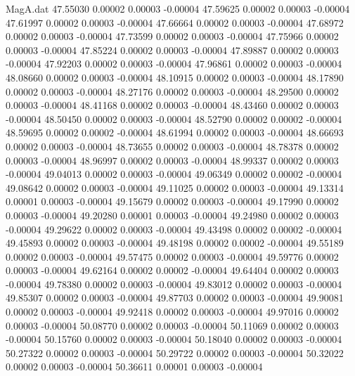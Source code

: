 \begin{filecontents}{MagA.dat}
  47.55030    0.00002    0.00003   -0.00004
  47.59625    0.00002    0.00003   -0.00004
  47.61997    0.00002    0.00003   -0.00004
  47.66664    0.00002    0.00003   -0.00004
  47.68972    0.00002    0.00003   -0.00004
  47.73599    0.00002    0.00003   -0.00004
  47.75966    0.00002    0.00003   -0.00004
  47.85224    0.00002    0.00003   -0.00004
  47.89887    0.00002    0.00003   -0.00004
  47.92203    0.00002    0.00003   -0.00004
  47.96861    0.00002    0.00003   -0.00004
  48.08660    0.00002    0.00003   -0.00004
  48.10915    0.00002    0.00003   -0.00004
  48.17890    0.00002    0.00003   -0.00004
  48.27176    0.00002    0.00003   -0.00004
  48.29500    0.00002    0.00003   -0.00004
  48.41168    0.00002    0.00003   -0.00004
  48.43460    0.00002    0.00003   -0.00004
  48.50450    0.00002    0.00003   -0.00004
  48.52790    0.00002    0.00002   -0.00004
  48.59695    0.00002    0.00002   -0.00004
  48.61994    0.00002    0.00003   -0.00004
  48.66693    0.00002    0.00003   -0.00004
  48.73655    0.00002    0.00003   -0.00004
  48.78378    0.00002    0.00003   -0.00004
  48.96997    0.00002    0.00003   -0.00004
  48.99337    0.00002    0.00003   -0.00004
  49.04013    0.00002    0.00003   -0.00004
  49.06349    0.00002    0.00002   -0.00004
  49.08642    0.00002    0.00003   -0.00004
  49.11025    0.00002    0.00003   -0.00004
  49.13314    0.00001    0.00003   -0.00004
  49.15679    0.00002    0.00003   -0.00004
  49.17990    0.00002    0.00003   -0.00004
  49.20280    0.00001    0.00003   -0.00004
  49.24980    0.00002    0.00003   -0.00004
  49.29622    0.00002    0.00003   -0.00004
  49.43498    0.00002    0.00002   -0.00004
  49.45893    0.00002    0.00003   -0.00004
  49.48198    0.00002    0.00002   -0.00004
  49.55189    0.00002    0.00003   -0.00004
  49.57475    0.00002    0.00003   -0.00004
  49.59776    0.00002    0.00003   -0.00004
  49.62164    0.00002    0.00002   -0.00004
  49.64404    0.00002    0.00003   -0.00004
  49.78380    0.00002    0.00003   -0.00004
  49.83012    0.00002    0.00003   -0.00004
  49.85307    0.00002    0.00003   -0.00004
  49.87703    0.00002    0.00003   -0.00004
  49.90081    0.00002    0.00003   -0.00004
  49.92418    0.00002    0.00003   -0.00004
  49.97016    0.00002    0.00003   -0.00004
  50.08770    0.00002    0.00003   -0.00004
  50.11069    0.00002    0.00003   -0.00004
  50.15760    0.00002    0.00003   -0.00004
  50.18040    0.00002    0.00003   -0.00004
  50.27322    0.00002    0.00003   -0.00004
  50.29722    0.00002    0.00003   -0.00004
  50.32022    0.00002    0.00003   -0.00004
  50.36611    0.00001    0.00003   -0.00004

\end{filecontents}
